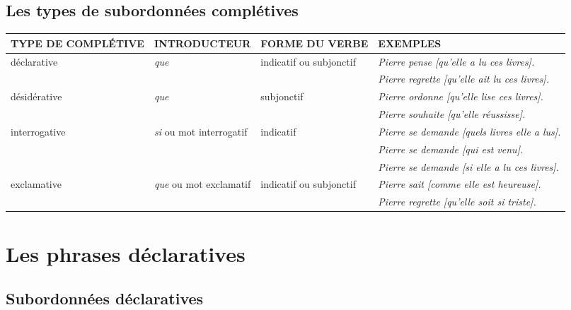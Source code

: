 \documentclass[UTF8]{report}
\begin{document}
\subsection{Les types de subordonnées complétives}


\begin{table}[H]
\centering
\begin{adjustbox}{max width=\textwidth}
    \begin{tabular}{|l|l|l|p{}|}
    \hline
    \rowcolor{cyan!20}
    \textbf{TYPE DE COMPLÉTIVE} & \textbf{INTRODUCTEUR} & \textbf{FORME DU VERBE} & \textbf{EXEMPLES} \\
    \hline
    déclarative & \textit{que} & indicatif ou subjonctif & \textit{Pierre pense [qu'elle a lu ces livres].} \\
    & & & \textit{Pierre regrette [qu'elle ait lu ces livres].} \\
    \hline
    désidérative & \textit{que} & subjonctif & \textit{Pierre ordonne [qu'elle lise ces livres].} \\
    & & & \textit{Pierre souhaite [qu'elle réussisse].} \\
    \hline
    interrogative & \textit{si} ou mot interrogatif & indicatif & \textit{Pierre se demande [quels livres elle a lus].} \\
    & & & \textit{Pierre se demande [qui est venu].} \\
    & & & \textit{Pierre se demande [si elle a lu ces livres].} \\
    \hline
    exclamative & \textit{que} ou mot exclamatif & indicatif ou subjonctif & \textit{Pierre sait [comme elle est heureuse].} \\
    & & & \textit{Pierre regrette [qu'elle soit si triste].} \\
    \hline
    \end{tabular}
\end{adjustbox}
\end{table} 



\section{Les phrases déclaratives}
\subsection{Subordonnées déclaratives}
\end{document}
